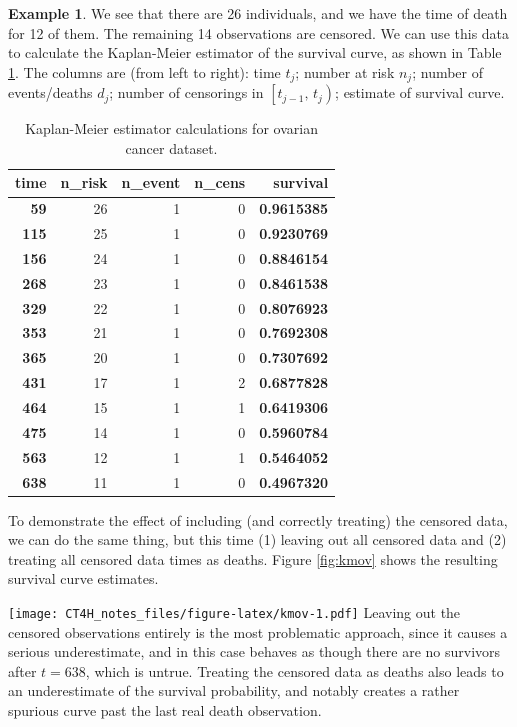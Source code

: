 \documentclass[
  openany]{book}
\theoremstyle{definition}
\theoremstyle{definition}
\newtheorem{example}{Example}[chapter]
\theoremstyle{definition}
\theoremstyle{definition}
\theoremstyle{remark}
\begin{document}
\begin{example}
We see that there are 26 individuals, and we have the time of death for 12 of them. The remaining 14 observations are censored.
We can use this data to calculate the Kaplan-Meier estimator of the survival curve, as shown in Table \ref{tab:ovkm}. The columns are (from left to right): time \(t_j\); number at risk \(n_j\); number of events/deaths \(d_j\); number of censorings in \(\left[t_{j-1},\,t_j\right)\); estimate of survival curve.

\begin{table}

\caption{\label{tab:ovkm}Kaplan-Meier estimator calculations for ovarian cancer dataset.}
\centering
\begin{tabular}[t]{>{}r|r|r|r|>{}r}
\hline
time & n\_risk & n\_event & n\_cens & survival\\
\hline
\textbf{59} & 26 & 1 & 0 & \textbf{0.9615385}\\
\hline
\textbf{115} & 25 & 1 & 0 & \textbf{0.9230769}\\
\hline
\textbf{156} & 24 & 1 & 0 & \textbf{0.8846154}\\
\hline
\textbf{268} & 23 & 1 & 0 & \textbf{0.8461538}\\
\hline
\textbf{329} & 22 & 1 & 0 & \textbf{0.8076923}\\
\hline
\textbf{353} & 21 & 1 & 0 & \textbf{0.7692308}\\
\hline
\textbf{365} & 20 & 1 & 0 & \textbf{0.7307692}\\
\hline
\textbf{431} & 17 & 1 & 2 & \textbf{0.6877828}\\
\hline
\textbf{464} & 15 & 1 & 1 & \textbf{0.6419306}\\
\hline
\textbf{475} & 14 & 1 & 0 & \textbf{0.5960784}\\
\hline
\textbf{563} & 12 & 1 & 1 & \textbf{0.5464052}\\
\hline
\textbf{638} & 11 & 1 & 0 & \textbf{0.4967320}\\
\hline
\end{tabular}
\end{table}

To demonstrate the effect of including (and correctly treating) the censored data, we can do the same thing, but this time (1) leaving out all censored data and (2) treating all censored data times as deaths. Figure \ref{fig:kmov} shows the resulting survival curve estimates.

\texttt{[image: CT4H\_notes\_files/figure-latex/kmov-1.pdf]}
Leaving out the censored observations entirely is the most problematic approach, since it causes a serious underestimate, and in this case behaves as though there are no survivors after \(t=638\), which is untrue. Treating the censored data as deaths also leads to an underestimate of the survival probability, and notably creates a rather spurious curve past the last real death observation.


\end{example}
\end{document}
